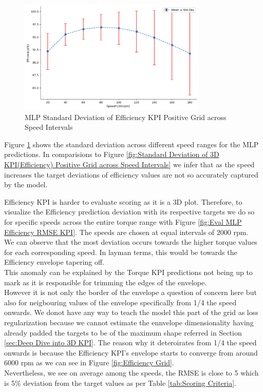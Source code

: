 \documentclass{report} %
\begin{document}
\begin{figure}[H]
    \centering
    \includegraphics[width=0.8\textwidth]{./ReportImages/stddev_y2_nn_MLP.png} 
    \caption{\ac{MLP} Standard Deviation of Efficiency \ac{KPI} Positive Grid across Speed Intervals} 
    \label{fig:MLP Standard Deviation of 3D KPI(Efficiency) Positive Grid across Speed Intervals}
\end{figure}

Figure \ref{fig:MLP Standard Deviation of 3D KPI(Efficiency) Positive Grid across Speed Intervals} shows the standard deviation across different speed ranges for the \ac{MLP} predictions.
In comparisions to Figure \ref{fig:Standard Deviation of 3D KPI(Efficiency) Positive Grid across Speed Intervals} we infer that as the speed increases the target deviations of efficiency values are not so accurately captured by the model.

Efficiency \ac{KPI} is harder to evaluate scoring as it is a \ac{3D} plot. 
Therefore, to visualize the Efficiency prediction deviation with its respective targets we do so for specific speeds across the entire torque range with Figure \ref{fig:Eval MLP Efficiency RMSE KPI}.
The speeds are chosen at equal intervals of 2000 rpm.\\
We can observe that the most deviation occurs towards the higher torque values for each corresponding speed. In layman terms, this would be towards the Efficiency envelope tapering off.\\
This anomaly can be explained by the Torque \ac{KPI} predictions not being up to mark as it is responsible for trimming the edges of the envelope.\\
However it is not only the border of the envelope a question of concern here but also for neigbouring values of the envelope specifically from 1/4 the speed onwards. 
We donot have any way to teach the model this part of the grid as loss regularization because we cannot estimate the ennvelope dimensionality having already padded the targets to be of the maximum shape referred in Section \ref{sec:Deep Dive into 3D KPI}.
The reason why it deteroirates from 1/4 the speed onwards is because the Efficiency \ac{KPI}'s envelope starts to converge from around 6000 rpm as we can see in Figure \ref{fig:Efficiency Grid}.\\
Nevertheless, we see on average among the speeds, the \ac{RMSE} is close to 5 which is 5\% deviation from the target values as per Table \ref{tab:Scoring Criteria}.\\
\end{document}
